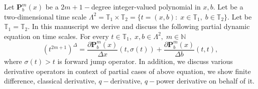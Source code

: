 Let $\mathbf{P}_b^m(x)$ be a $2m+1-$degree integer-valued polynomial in $x,b$.
Let be a two-dimensional time scale
$\Lambda^2 = \mathbb{T}_1 \times \mathbb{T}_2 = \{t=(x, b) \colon \; x\in\mathbb{T}_1, \; b\in\mathbb{T}_2 \}$.
Let be $\mathbb{T}_1 = \mathbb{T}_2$.
In this manuscript we derive and discuss the following partial dynamic equation on time scales.
For every $t\in\mathbb{T}_1, \; x,b\in \Lambda^2, \; m\in\mathbb{N}$
\[
    (t^{2m+1})^{\Delta} =
    \frac{\partial \mathbf{P}_b^m(x)}{\Delta x}(t, \sigma(t)) +
    \frac{\partial \mathbf{P}_b^m(x)}{\Delta b}(t, t),
\]
where $\sigma(t) > t$ is forward jump operator.
In addition, we discuss various derivative operators in context of partial cases of above equation,
we show finite difference, classical derivative, $q-$derivative, $q-$power derivative on behalf of it.